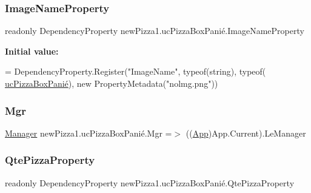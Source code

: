 \subsubsection{\texorpdfstring{Image\+Name\+Property}{ImageNameProperty}}
{\footnotesize\ttfamily readonly Dependency\+Property new\+Pizza1.\+uc\+Pizza\+Box\+Panié.\+Image\+Name\+Property\hspace{0.3cm}{\ttfamily [static]}}

{\bfseries Initial value\+:}
\begin{DoxyCode}
=
            DependencyProperty.Register(\textcolor{stringliteral}{"ImageName"}, typeof(\textcolor{keywordtype}{string}), typeof(
      \hyperlink{classnewPizza1_1_1ucPizzaBoxPani_xC3_xA9_a56d476316603c46b5fbb8e6fbb358341}{ucPizzaBoxPanié}), \textcolor{keyword}{new} PropertyMetadata(\textcolor{stringliteral}{"nolmg.png"}))
\end{DoxyCode}
\mbox{\label{classnewPizza1_1_1ucPizzaBoxPani_xC3_xA9_a8bf5e4ad9d5295a1d0b9ea6274f7d13f}} 
\subsubsection{\texorpdfstring{Mgr}{Mgr}}
{\footnotesize\ttfamily \hyperlink{classModele_1_1Manager}{Manager} new\+Pizza1.\+uc\+Pizza\+Box\+Panié.\+Mgr =$>$ ((\hyperlink{classnewPizza1_1_1App}{App})App.\+Current).Le\+Manager}

\mbox{\label{classnewPizza1_1_1ucPizzaBoxPani_xC3_xA9_a796de413f86211769bb19e20a5c5ed44}} 
\subsubsection{\texorpdfstring{Qte\+Pizza\+Property}{QtePizzaProperty}}
{\footnotesize\ttfamily readonly Dependency\+Property new\+Pizza1.\+uc\+Pizza\+Box\+Panié.\+Qte\+Pizza\+Property\hspace{0.3cm}{\ttfamily [static]}}

